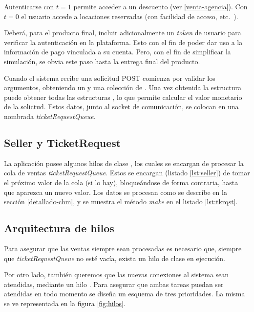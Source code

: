 Autenticarse con \(t = 1\) permite acceder a un descuento (ver \ref{venta-agencia}).
Con \(t=0\) el usuario accede a locaciones reservadas (con facilidad de acceso, etc.~).

Deberá, para el producto final, incluir adicionalmente un \emph{token} de usuario para verificar la autenticación en la plataforma.
Esto con el fin de poder dar uso a la información de pago vinculada a su cuenta.
Pero, con el fin de simplificar la simulación, se obvia este paso hasta la entrega final del producto.

Cuando el sistema recibe una solicitud POST comienza por validar los argumentos, obteniendo un  y una colección de .
Una vez obtenida la estructura  puede obtener todas las estructuras , lo que permite calcular el valor monetario de la solictud.
Estos datos, junto al socket de comunicación, se colocan en una  nombrada \emph{ticketRequestQueue}.

\subsection{Seller y TicketRequest}

La aplicación posee algunos hilos de clase , los cuales se encargan de procesar la cola de ventas \emph{ticketRequestQueue}.
Estos se encargan (listado \ref{lst:seller}) de tomar el próximo valor de la cola (si lo hay), bloqueándose de forma contraria, hasta que aparezca un nuevo valor.
Los datos se procesan como se describe en la sección \ref{detallado-chm}, y se muestra el método \emph{make} en el listado \ref{lst:tkrqst}.




\subsection{Arquitectura de hilos}\label{arq-hilos}

Para asegurar que las ventas siempre sean procesadas es necesario que,
siempre que \emph{ticketRequestQueue} no esté vacía,
exista un hilo de clase  en ejecución.

Por otro lado, también queremos que las nuevas conexiones al sistema sean atendidas, mediante un hilo .
Para asegurar que ambas tareas puedan ser atendidas en todo momento se diseña un esquema de tres prioridades.
La misma se ve representada en la figura \ref{fig:hilos}.

